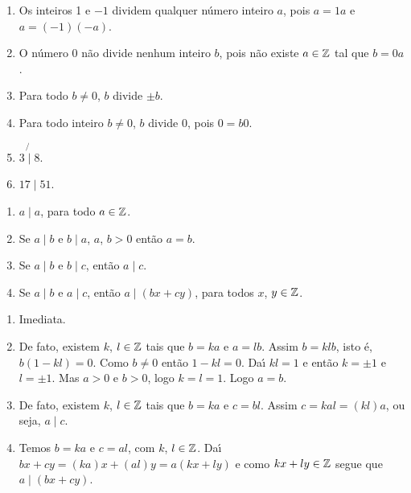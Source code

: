 \begin{exemplos}
    \begin{enumerate}[label={\arabic*})]
        \item Os inteiros 1 e $-1$ dividem qualquer n{\'u}mero inteiro $a$, pois $a = 1 a$ e $a = (-1)(-a)$.
        \item O n{\'u}mero 0 n{\~a}o divide nenhum inteiro $b$, pois n{\~a}o existe $a \in \mathbb{Z}$ tal que $b = 0a$.
        \item Para todo $b\neq 0$, $b$ divide $\pm b$.
        \item Para todo inteiro $b\neq 0$, $b$ divide 0, pois $0 = b0$.
        \item $3 \not{\mid} 8$.
        \item $17 \mid 51$.
    \end{enumerate}
\end{exemplos}


\begin{proposicao}
    \begin{enumerate}[label={\roman*})]
        \item $a\mid a$, para todo $a \in \mathbb{Z}$.
        \item Se $a\mid b$ e $b\mid a$, $a$, $b > 0$ ent\~ao $a = b$.
        \item Se $a\mid b$ e $b\mid c$, ent{\~a}o $a\mid c$.
        \item Se $a\mid b$ e $a\mid c$, ent{\~a}o $a\mid (bx+cy)$, para todos $x$, $y \in \mathbb{Z}$.
    \end{enumerate}
\end{proposicao}
\begin{prova}
    \begin{enumerate}[label={\roman*})]
        \item Imediata.

        \item De fato, existem $k$, $l \in \mathbb{Z} $ tais que $b = ka$ e $a = lb$. Assim $b = klb$, isto \'e, $b(1 - kl) = 0$.
        Como $b \ne 0$ ent\~ao $1 - kl = 0$. Da{\'\i} $kl = 1$ e ent\~ao $k = \pm 1$ e $l = \pm 1$. Mas $a > 0$ e $b > 0$, logo $k = l =1$. Logo $a = b$.

        \item De fato, existem $k$, $l \in \mathbb{Z}$ tais que $b = ka$ e $c = bl$. Assim  $c = kal = (kl)a$, ou seja, $a\mid c$.

        \item Temos $b = ka$ e $c = al$, com $k$, $l \in \mathbb{Z}$. Da{\'\i} $bx + cy = (ka)x + (al)y = a(kx + ly)$ e como $kx + ly \in \mathbb{Z}$ segue que $a \mid (bx + cy)$.
    \end{enumerate}
\end{prova}

